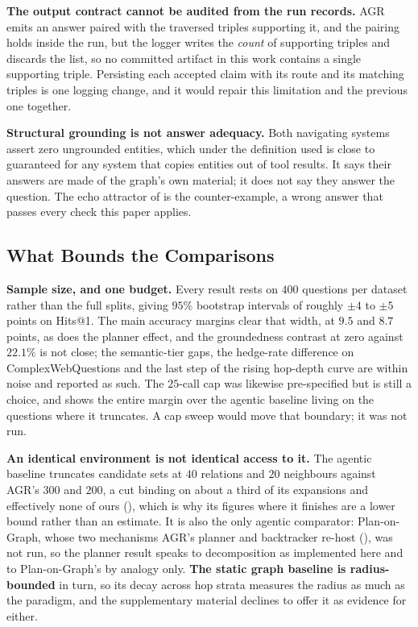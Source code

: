 \textbf{The output contract cannot be audited from the run records.} AGR
emits an answer paired with the traversed triples supporting it, and the
pairing holds inside the run, but the logger writes the \emph{count} of
supporting triples and discards the list, so no committed artifact in
this work contains a single supporting triple. Persisting each accepted
claim with its route and its matching triples is one logging change, and
it would repair this limitation and the previous one together.

\textbf{Structural grounding is not answer adequacy.} Both navigating
systems assert zero ungrounded entities, which under the definition used
is close to guaranteed for any system that copies entities out of tool
results. It says their answers are made of the graph's own material; it
does not say they answer the question. The echo attractor of
 is the counter-example, a wrong answer that passes every
check this paper applies.

\subsection{What Bounds the Comparisons}\label{sec:limits-comparison}

\textbf{Sample size, and one budget.} Every result rests on $400$
questions per dataset rather than the full splits, giving $95\%$
bootstrap intervals of roughly $\pm4$ to $\pm5$ points on Hits@1. The
main accuracy margins clear that width, at $9.5$ and $8.7$ points, as
does the planner effect, and the groundedness contrast at zero against
$22.1\%$ is not close; the semantic-tier gaps, the hedge-rate difference
on ComplexWebQuestions and the last step of the rising hop-depth curve
are within noise and reported as such. The $25$-call cap was likewise
pre-specified but is still a choice, and  shows the
entire margin over the agentic baseline living on the questions where it
truncates. A cap sweep would move that boundary; it was not run.

\textbf{An identical environment is not identical access to it.} The
agentic baseline truncates candidate sets at $40$ relations and $20$
neighbours against AGR's $300$ and $200$, a cut binding on about a third
of its expansions and effectively none of ours (),
which is why its figures where it finishes are a lower bound rather than
an estimate. It is also the only agentic comparator: Plan-on-Graph,
whose two mechanisms AGR's planner and backtracker re-host
(), was not run, so the planner result speaks to
decomposition as implemented here and to Plan-on-Graph's by analogy
only. \textbf{The static graph baseline is radius-bounded} in turn, so
its decay across hop strata measures the radius as much as the paradigm,
and the supplementary material declines to offer it as evidence for
either.

